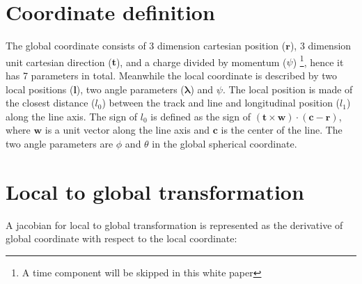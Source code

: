 \documentclass[12pt,a4paper]{scrarticle}
\begin{document}
\maketitle

\begin{abstract}
    
\end{abstract}

\newcommand{\jacobianLocalToGlobal}{\mathbb{J}_{G}}
\newcommand{\jacobianGlobalToLocal}{\mathbb{J}_{L}}

\newcommand{\globalPosition}{\mathbf{r}}
\newcommand{\globalDirection}{\mathbf{t}}
\newcommand{\qoverp}{\psi}

\newcommand{\localPosition}{\mathbf{l}}
\newcommand{\localAngle}{\boldsymbol{\lambda}}
\newcommand{\surfaceCenter}{\mathbf{c}}
\newcommand{\surfaceNormal}{\mathbf{w}}
\newcommand{\ubasis}{\mathbf{u}}
\newcommand{\vbasis}{\mathbf{v}}
\newcommand{\localPosU}{l_0}
\newcommand{\localPosV}{l_1}

\newcommand{\zeroMatrix}{\mathbb{O}}

\tableofcontents

\section{Coordinate definition}
 The global coordinate consists of 3 dimension cartesian position ($\globalPosition$), 3 dimension unit cartesian direction ($\globalDirection$), and a charge divided by momentum ($\qoverp$) \footnote{A time component will be skipped in this white paper}, hence it has 7 parameters in total. Meanwhile the local coordinate is described by two local positions ($\localPosition$), two angle parameters ($\localAngle$) and $\qoverp$. The local position is made of the closest distance ($l_0$) between the track and line and longitudinal position ($l_1$) along the line axis. The sign of $l_0$ is defined as the sign of $ (\globalDirection \times \surfaceNormal) \cdot (\surfaceCenter - \globalPosition)$, where $\surfaceNormal$ is a unit vector along the line axis and $\surfaceCenter$ is the center of the line. The two angle parameters are $\phi$ and $\theta$ in the global spherical coordinate.
 
\section{Local to global transformation}

A jacobian for local to global transformation is represented as the derivative of global coordinate with respect to the local coordinate:
\end{document}
